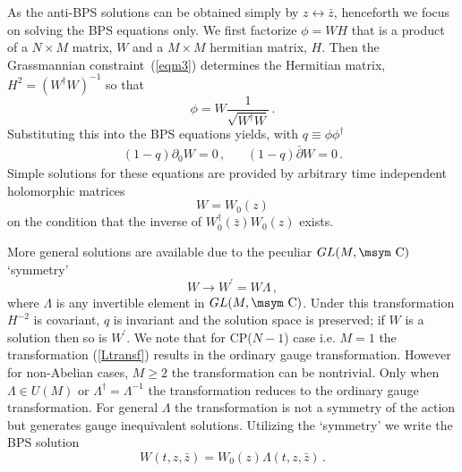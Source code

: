 \documentclass[a4paper,12pt]{article}
\def\Com{{\mathop{\hbox{\msym \char  '103}}}}
\begin{document}
As the anti-BPS solutions can be obtained simply by $z\leftrightarrow
\bar{z}$, henceforth we focus on solving the BPS equations only.
We first factorize    $\phi=WH$ that is   a product of a  $N\times M$
matrix, $W$  and  a $M\times M$ hermitian matrix, $H$. Then
the Grassmannian constraint~(\ref{eqm3}) determines the Hermitian matrix,  $H^{2}=(W^{\dagger}W)^{-1}$ so that
\begin{equation}
\phi=W\displaystyle{\frac{1}{\sqrt{W^{\dagger}W}}}\,. \label{psiW}
\end{equation}
Substituting this into the BPS equations yields, with $q\equiv\phi\phi^{\dagger}$
\begin{equation}
\begin{array}{ll}
(1-q)\partial_{0}W=0\,,~~&~~(1-q)\bar{\partial}W=0\,.
\end{array}
\end{equation}
Simple solutions for these equations are provided by arbitrary time independent holomorphic matrices
\begin{equation}
W=W_{0}(z)
\end{equation}
on the condition that the inverse of
$W^{\dagger}_{0}(\bar{z})W_{0}(z)$ exists. \newline

More general solutions are available due to the peculiar $GL(M,\Com)$  `symmetry'
\begin{equation}
W\longrightarrow W^{\prime}=W\Lambda\,,
\label{Ltransf}
\end{equation}
where $\Lambda$ is any invertible element in $GL(M,\Com)$.  Under this transformation $H^{-2}$ is covariant, $q$ is invariant and the solution space is
preserved; if $W$ is a solution then so is $W^{\prime}$.
We note that for CP($N-1$) case i.e. $M=1$  the transformation (\ref{Ltransf}) results in   the  ordinary gauge transformation. However for non-Abelian
cases, $M\geq 2$  the transformation can be nontrivial. Only when $\Lambda\in U(M)$ or $\Lambda^{\dagger}=\Lambda^{-1}$ the transformation  reduces to
the  ordinary gauge transformation.  For general $\Lambda$  the transformation is not a symmetry of the action  but generates gauge inequivalent
solutions. Utilizing the `symmetry' we write the BPS solution
\begin{equation}\label{W}
W(t,z,\bar{z})=W_{0}(z)\Lambda(t,z,\bar{z})\,.
\end{equation}
\end{document}
